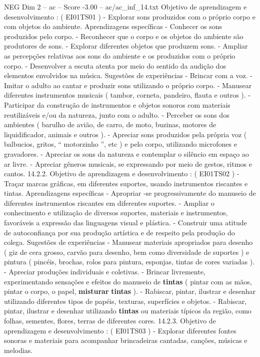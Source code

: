 \begin{textsample}{NEG Dim 2 – ac – Score -3.00 – ac/ac\_inf\_14.txt}
Objetivo de aprendizagem e desenvolvimento : ( EI01TS01 ) - Explorar sons produzidos com o próprio corpo e com objetos do ambiente.
Aprendizagens específicas - Conhecer os sons produzidos pelo corpo. - Reconhecer que o corpo e os objetos do ambiente são produtores de sons. - Explorar diferentes objetos que produzem sons. - Ampliar as percepções relativas aos sons do ambiente e os produzidos com o próprio corpo. - Desenvolver a escuta atenta por meio do sentido da audição dos elementos envolvidos na música.
Sugestões de experiências - Brincar com a voz. - Imitar o adulto ao cantar e produzir sons utilizando o próprio corpo. - Manusear diferentes instrumentos musicais ( tambor, corneta, pandeiro, flauta e outros ). - Participar da construção de instrumentos e objetos sonoros com materiais reutilizáveis e/ou da natureza, junto com o adulto. - Perceber os sons dos ambientes ( barulho de avião, de carro, de moto, buzinas, motores de liquidificador, animais e outros ). - Apreciar sons produzidos pela própria voz ( balbucios, gritos, “ motorzinho ”, etc ) e pelo corpo, utilizando microfones e gravadores. - Apreciar os sons da natureza e contemplar o silêncio em espaço ao ar livre. - Apreciar gêneros musicais, se expressando por meio de gestos, ritmos e cantos. 14.2.2.
Objetivo de aprendizagem e desenvolvimento : ( EI01TS02 ) - Traçar marcas gráficas, em diferentes suportes, usando instrumentos riscantes e tintas.
Aprendizagens específicas - Apropriar -se progressivamente do manuseio de diferentes instrumentos riscantes em diferentes suportes. - Ampliar o conhecimento e utilização de diversos suportes, materiais e instrumentos, favoráveis a expressão das linguagens visual e plástica. - Construir uma atitude de autoconfiança por sua produção artística e de respeito pela produção do colega.
Sugestões de experiências - Manusear materiais apropriados para desenho ( giz de cera grosso, carvão para desenho, bem como diversidade de suportes ) e pintura ( pincéis, brochas, rolos para pintura, esponjas, tintas de cores variadas ). - Apreciar produções individuais e coletivas. - Brincar livremente, experimentando sensações e efeitos do manuseio de \textbf{tintas} ( pintar com as mãos, pintar o corpo, o papel, \textbf{misturar} \textbf{tintas} ). - Rabiscar, pintar, ilustrar e desenhar utilizando diferentes tipos de papéis, texturas, superfícies e objetos. - Rabiscar, pintar, ilustrar e desenhar utilizando \textbf{tintas} ou materiais típicos da região, como folhas, sementes, flores, terras de diferentes cores. 14.2.3.
Objetivo de aprendizagem e desenvolvimento : ( EI01TS03 ) - Explorar diferentes fontes sonoras e materiais para acompanhar brincadeiras cantadas, canções, músicas e melodias.

\end{textsample}
